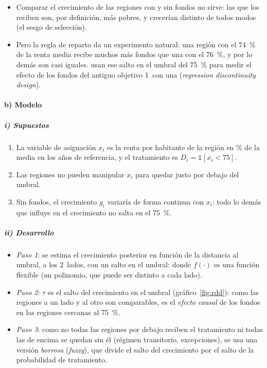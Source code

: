 \documentclass[11pt]{article}
\begin{document}
\begin{itemize}
\item Comparar el crecimiento de las regiones con y sin fondos no sirve: las que los reciben son, por definición, más pobres, y crecerían distinto de todos modos (el sesgo de selección).
\item Pero la regla de reparto da un experimento natural: una región con el 74~\% de la renta media recibe muchos más fondos que una con el 76~\%, y por lo demás son casi iguales. \textcite{BeckerEggerVonEhrlich2010} usan ese salto en el umbral del 75~\% para medir el efecto de los fondos del antiguo objetivo 1~con una  (\emph{regression discontinuity design}).
\end{itemize}

\paragraph{b) Modelo}

\subparagraph{i) Supuestos}

\begin{enumerate}
\item La variable de asignación $x_i$ es la renta por habitante de la región en \% de la media en los años de referencia, y el tratamiento es $D_i=\mathbb{1}[x_i<75]$.
\item Las regiones no pueden manipular $x_i$ para quedar justo por debajo del umbral.
\item Sin fondos, el crecimiento $g_i$ variaría de forma continua con $x_i$: todo lo demás que influye en el crecimiento no salta en el 75~\%.
\end{enumerate}

\subparagraph{ii) Desarrollo}

\begin{itemize}
\item \emph{Paso 1}: se estima el crecimiento posterior en función de la distancia al umbral, a los 2~lados, con un salto en el umbral:
  donde $f(\cdot)$ es una función flexible (un polinomio, que puede ser distinto a cada lado).
\item \emph{Paso 2}: $\tau$ es el salto del crecimiento en el umbral (gráfico~\ref{fig:rdd}): como las regiones a un lado y al otro son comparables, es el \emph{efecto causal} de los fondos en las regiones cercanas al 75~\%.
\item \emph{Paso 3}: como no todas las regiones por debajo reciben el tratamiento ni todas las de encima se quedan sin él (régimen transitorio, excepciones), se usa una versión \emph{borrosa} (\emph{fuzzy}), que divide el salto del crecimiento por el salto de la probabilidad de tratamiento.
\end{itemize}
\end{document}
